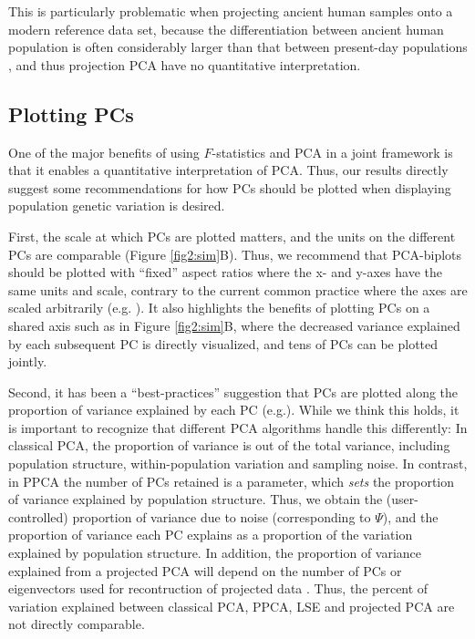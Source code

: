 \documentclass[12pt, letterpaper]{article}
\begin{document}
This is particularly problematic when projecting ancient human samples onto a modern reference data set, because the differentiation between ancient human population is often considerably larger than that between present-day populations \citep{haak_massive_2015, lazaridis_ancient_2014}, and thus projection PCA have no quantitative interpretation.


\subsection{Plotting PCs}
One of the major benefits of using $F$-statistics and PCA in a joint framework is that it enables a quantitative interpretation of PCA. Thus, our results directly suggest some recommendations for how PCs should be plotted when displaying population genetic variation is desired. 

First, the scale at which PCs are plotted matters, and the units on the different PCs are comparable (Figure \ref{fig2:sim}B). Thus, we recommend that PCA-biplots should be plotted with ``fixed'' aspect ratios where the x- and y-axes have the same units and scale, contrary to the current common practice where the axes are scaled arbitrarily (e.g. \cite{novembre_genes_2008, peter_genetic_2020}). It also highlights the benefits of plotting PCs on a shared axis such as in Figure \ref{fig2:sim}B, where the decreased variance explained by each subsequent PC is directly visualized, and tens of PCs can be plotted jointly.

Second, it has been a ``best-practices'' suggestion that PCs are plotted along the proportion of variance explained by each PC (e.g.\cite{novembre_recent_2016, elhaik_principal_2022}). While we think this holds, it is important to recognize that different PCA algorithms handle this differently: In classical PCA, the proportion of variance is out of the total variance, including population structure, within-population variation and sampling noise. In contrast, in PPCA the number of PCs retained is a parameter, which \emph{sets} the proportion of variance explained by population structure. Thus, we obtain the (user-controlled) proportion of variance due to noise (corresponding to $\Psi$), and the proportion of variance each PC explains as a proportion of the variation explained by population structure. In addition, the proportion of variance explained from a projected PCA will depend on the number of PCs or eigenvectors used for recontruction of projected data \cite{patterson_population_2006}. 
Thus, the percent of variation explained between classical PCA, PPCA, LSE and projected PCA are not directly comparable.
\end{document}
